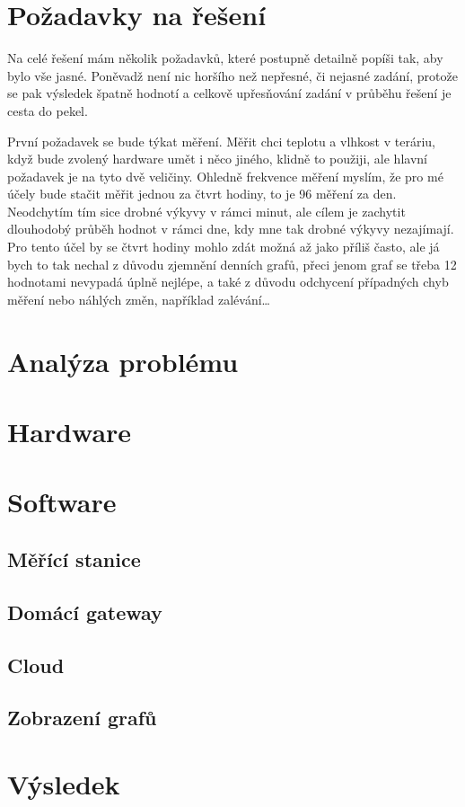 \chapter{Požadavky na řešení}
Na celé řešení mám několik požadavků, které postupně detailně popíši tak, aby bylo vše jasné. Poněvadž není nic horšího 
než nepřesné, či nejasné zadání, protože se pak výsledek špatně hodnotí a celkově upřesňování zadání v průběhu řešení je 
cesta do pekel.

První požadavek se bude týkat měření. Měřit chci teplotu a vlhkost v teráriu, když bude zvolený hardware umět i něco 
jiného, klidně to použiji, ale hlavní požadavek je na tyto dvě veličiny. Ohledně frekvence měření myslím, že pro mé 
účely bude stačit měřit jednou za čtvrt hodiny, to je 96 měření za den. Neodchytím tím sice drobné výkyvy v rámci minut, 
ale cílem je zachytit dlouhodobý průběh hodnot v rámci dne, kdy mne tak drobné výkyvy nezajímají. Pro tento účel by se 
čtvrt hodiny mohlo zdát možná až jako příliš často, ale já bych to tak nechal z důvodu zjemnění denních grafů, přeci 
jenom graf se třeba 12 hodnotami nevypadá úplně nejlépe, a také z důvodu odchycení případných chyb měření nebo náhlých 
změn, například zalévání\ldots
\chapter{Analýza problému}
\chapter{Hardware}
\chapter{Software}
\section{Měřící stanice}
\section{Domácí gateway}
\section{Cloud}
\section{Zobrazení grafů}
\chapter{Výsledek}
